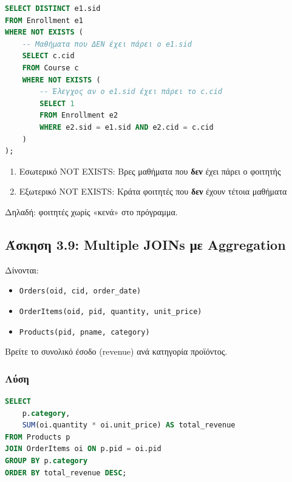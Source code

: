 \begin{lstlisting}[language=SQL]
SELECT DISTINCT e1.sid
FROM Enrollment e1
WHERE NOT EXISTS (
    -- Μαθήματα που ΔΕΝ έχει πάρει ο e1.sid
    SELECT c.cid
    FROM Course c
    WHERE NOT EXISTS (
        -- Έλεγχος αν ο e1.sid έχει πάρει το c.cid
        SELECT 1
        FROM Enrollment e2
        WHERE e2.sid = e1.sid AND e2.cid = c.cid
    )
);
\end{lstlisting}

\begin{infobox}
\begin{enumerate}
    \item Εσωτερικό NOT EXISTS: Βρες μαθήματα που \textbf{δεν} έχει πάρει ο φοιτητής
    \item Εξωτερικό NOT EXISTS: Κράτα φοιτητές που \textbf{δεν} έχουν τέτοια μαθήματα
\end{enumerate}
Δηλαδή: φοιτητές χωρίς «κενά» στο πρόγραμμα.
\end{infobox}

\subsection{Άσκηση 3.9: Multiple JOINs με Aggregation}

\begin{formulabox}[Εκφώνηση]
Δίνονται:
\begin{itemize}
    \item \texttt{Orders(oid, cid, order\_date)}
    \item \texttt{OrderItems(oid, pid, quantity, unit\_price)}
    \item \texttt{Products(pid, pname, category)}
\end{itemize}

Βρείτε το συνολικό έσοδο (revenue) ανά κατηγορία προϊόντος.
\end{formulabox}

\subsubsection*{Λύση}

\begin{lstlisting}[language=SQL]
SELECT
    p.category,
    SUM(oi.quantity * oi.unit_price) AS total_revenue
FROM Products p
JOIN OrderItems oi ON p.pid = oi.pid
GROUP BY p.category
ORDER BY total_revenue DESC;
\end{lstlisting}

